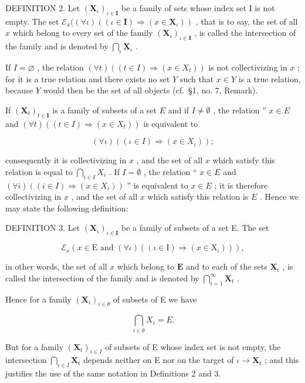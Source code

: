 DEFINITION 2. Let \((\mathbf{X}_{\iota})_{\iota \in \mathbf{I}}\) be a family of sets whose index set I is not empty. The set \(\mathcal{E}_x((\forall \iota)((\iota \in \mathbf{I}) \Longrightarrow (x \in \mathbf{X}_{\iota}))\) , that is to say, the set of all \(x\) which belong to every set of the family \((\mathbf{X}_{\iota})_{\iota \in \mathbf{I}}\) , is called the intersection of the family and is denoted by \(\bigcap_{\iota} \mathbf{X}_{\iota}\) .

If \(I = \varnothing\) , the relation \((\forall t)((t \in I) \Longrightarrow (x \in X_t))\) is not collectivizing in \(x\) ; for it is a true relation and there exists no set \(Y\) such that \(x \in Y\) is a true relation, because \(Y\) would then be the set of all objects (cf.~§1, no. 7, Remark).

If \((\mathbf{X}_t)_{t \in \mathbf{I}}\) is a family of subsets of a set \(E\) and if \(I \neq \emptyset\) , the relation '' \(x \in E\) and \((\forall t)((t \in I) \Longrightarrow (x \in X_t))\) is equivalent to

\[
(\forall \iota) ((\iota \in I) \Longrightarrow (x \in X _ {\iota}));
\]

consequently it is collectivizing in \(x\) , and the set of all \(x\) which satisfy this relation is equal to \(\bigcap_{i \in I} X_i\) . If \(I = \emptyset\) , the relation `` \(x \in E\) and \((\forall i)((i \in I) \Longrightarrow (x \in X_i))\) '' is equivalent to \(x \in E\) ; it is therefore collectivizing in \(x\) , and the set of all \(x\) which satisfy this relation is \(E\) . Hence we may state the following definition:

DEFINITION 3. Let \((\mathbf{X}_{\iota})_{\iota \in \mathbf{I}}\) be a family of subsets of a set E. The set

\[
\mathcal {E} _ {x} (x \in \mathrm{E} \text {   and   } (\forall \iota) ((\iota \in \mathrm{I}) \Longrightarrow (x \in \mathrm{X} _ {\iota}))),
\]

in other words, the set of all \(x\) which belong to \(\mathbf{E}\) and to each of the sets \(\mathbf{X}_t\) , is called the intersection of the family and is denoted by \(\bigcap_{i=1}^{\infty} \mathbf{X}_t\) .

Hence for a family \((\mathbf{X}_{i})_{i\in\theta}\) of subsets of E we have

\[
\bigcap_ {i \in \theta} X _ {i} = E.
\]

But for a family \((\mathbf{X}_t)_{i\in I}\) of subsets of E whose index set is not empty, the intersection \(\bigcap_{i\in I}\mathbf{X}_t\) depends neither on E nor on the target of \(\iota \to \mathbf{X}_t\) ; and this justifies the use of the same notation in Definitions 2 and 3.

